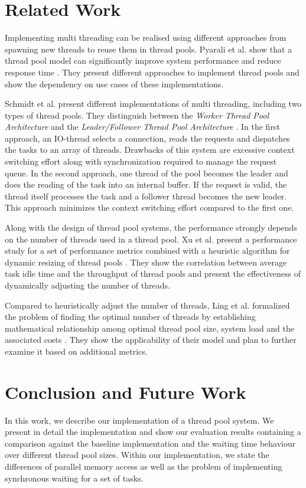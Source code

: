 \documentclass[conference]{IEEEtran}
\begin{document}
\section{Related Work}
Implementing multi threading can be realised using different approaches from spawning new threads to reuse them in thread pools. Pyarali et al. show that a thread pool model can significantly improve system performance and reduce response time \cite{pyarali2001evaluating}. They present different approaches to implement thread pools and show the dependency on use cases of these implementations.

Schmidt et al. present different implementations of multi threading, including two types of thread pools. They distinguish between the \emph{Worker Thread Pool Architecture} and the \emph{Leader/Follower Thread Pool Architecture} \cite{schmidt1998evaluating}. In the first approach, an IO-thread selects a connection, reads the requests and dispatches the tasks to an array of threads. Drawbacks of this system are excessive context switching effort along with synchronization required to manage the request queue. In the second approach, one thread of the pool becomes the leader and does the reading of the task into an internal buffer. If the request is valid, the thread itself processes the task and a follower thread becomes the new leader. This approach minimizes the context switching effort compared to the first one.

Along with the design of thread pool systems, the performance strongly depends on the number of threads used in a thread pool. Xu et al. present a performance study for a set of performance metrics combined with a heuristic algorithm for dynamic resizing of thread pools \cite{xu2004performance}. They show the correlation between average task idle time and the throughput of thread pools and present the effectiveness of dynamically adjusting the number of threads.

Compared to heuristically adjust the number of threads, Ling et al. formalized the problem of finding the optimal number of threads by establishing mathematical relationship among optimal thread pool size, system load and the associated costs \cite{ling2000analysis}. They show the applicability of their model and plan to further examine it based on additional metrics.

\section{Conclusion and Future Work}
In this work, we describe our implementation of a thread pool system. We present in detail the implementation and show our evaluation results containing a comparison against the baseline implementation and the waiting time behaviour over different thread pool sizes. Within our implementation, we state the differences of parallel memory access as well as the problem of implementing synchronous waiting for a set of tasks.
\end{document}
